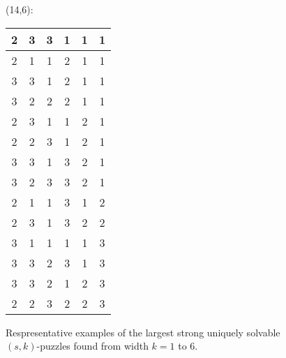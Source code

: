 \documentclass[11pt]{article}
\begin{document}
\begin{figure}
\begin{multicols}{4}
  (14,6):\\[.5ex]
  \begin{tabular}{|c|c|c|c|c|c|}
    \hline
    2&3&3&1&1&1 \\ \hline
    2&1&1&2&1&1 \\ \hline
    3&3&1&2&1&1 \\\hline
    3&2&2&2&1&1 \\\hline
    2&3&1&1&2&1 \\\hline
    2&2&3&1&2&1 \\\hline
    3&3&1&3&2&1 \\\hline
    3&2&3&3&2&1 \\\hline
    2&1&1&3&1&2 \\\hline
    2&3&1&3&2&2 \\\hline
    3&1&1&1&1&3 \\\hline
    3&3&2&3&1&3 \\\hline
    3&3&2&1&2&3 \\\hline
    2&2&3&2&2&3 \\\hline
  \end{tabular}
  \end{multicols}
  \caption{Respresentative examples of the largest strong uniquely
    solvable $(s,k)$-puzzles found from width $k = 1$ to $6$.}
\end{figure}
\end{document}
